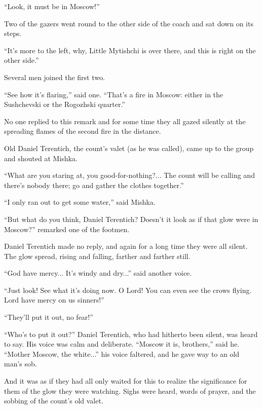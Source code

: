 ``Look, it must be in Moscow!''

Two of the gazers went round to the other side of the coach and
sat down on its steps.

``It's more to the left, why, Little Mytishchi is over there, and
this is right on the other side.''

Several men joined the first two.

``See how it's flaring,'' said one. ``That's a fire in Moscow:
either in the Sushchevski or the Rogozhski quarter.''

No one replied to this remark and for some time they all gazed
silently at the spreading flames of the second fire in the
distance.

Old Daniel Terentich, the count's valet (as he was called), came
up to the group and shouted at Mishka.

``What are you staring at, you good-for-nothing?... The count
will be calling and there's nobody there; go and gather the
clothes together.''

``I only ran out to get some water,'' said Mishka.

``But what do you think, Daniel Terentich? Doesn't it look as if
that glow were in Moscow?'' remarked one of the footmen.

Daniel Terentich made no reply, and again for a long time they
were all silent. The glow spread, rising and falling, farther and
farther still.

``God have mercy... It's windy and dry...'' said another voice.

``Just look! See what it's doing now. O Lord! You can even see
the crows flying. Lord have mercy on us sinners!''

``They'll put it out, no fear!''

``Who's to put it out?'' Daniel Terentich, who had hitherto been
silent, was heard to say. His voice was calm and
deliberate. ``Moscow it is, brothers,'' said he. ``Mother Moscow,
the white...'' his voice faltered, and he gave way to an old
man's sob.

And it was as if they had all only waited for this to realize the
significance for them of the glow they were watching. Sighs were
heard, words of prayer, and the sobbing of the count's old valet.


